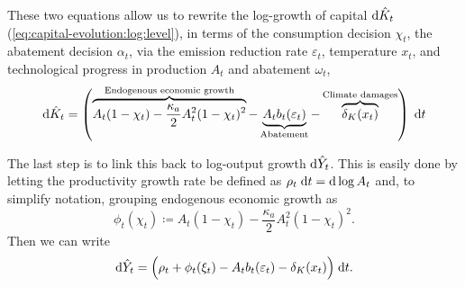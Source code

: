 \documentclass[../../main.tex]{subfiles}
\begin{document}
These two equations allow us to rewrite the log-growth of capital $\mathrm{d}\hat K_t$ (\ref{eq:capital-evolution:log:level}), in terms of the consumption decision $\chi_t$, the abatement decision $\alpha_t$, via the emission reduction rate $\varepsilon_t$, temperature $x_t$, and technological progress in production $A_t$ and abatement $\omega_t$, \begin{equation} \label{eq:capital-evolution:log:growth}
    \mathrm{d}\hat K_t = \left( \overbrace{A_t (1 - \chi_t) - \frac{\kappa_a}{2} A^2_t (1 - \chi_t)^2}^{\text{Endogenous economic growth}} - \underbrace{A_t b_t(\varepsilon_t)}_{\text{Abatement}} - \overbrace{\delta_K(x_t)}^{\text{Climate damages}} \right) \; \mathrm{d}t
\end{equation} 

The last step is to link this back to log-output growth $\mathrm{d}\hat Y_t$. This is easily done by letting the productivity growth rate be defined as $\rho_t \; \mathrm{d}t = \mathrm{d}\log A_t$ and, to simplify notation, grouping endogenous economic growth as \begin{equation}
    \phi_t(\chi_t) \coloneqq A_t (1 - \chi_t) - \frac{\kappa_a}{2} A^2_t (1 - \chi_t)^2.
\end{equation} Then we can write \begin{equation} \label{eq:output-evolution:log}
    \mathrm{d}\hat Y_t = \Big(\rho_t + \phi_t(\xi_t) - A_t b_t(\varepsilon_t) - \delta_K(x_t) \Big) \; \mathrm{d}t.
\end{equation}
\end{document}
